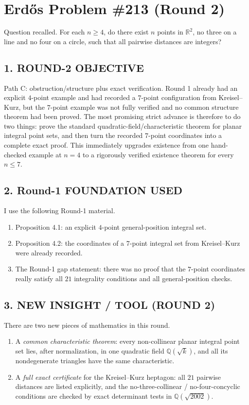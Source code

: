 \section*{Erd\H{o}s Problem \#213 (Round 2)}

Question recalled. For each $n\geq 4$, do there exist $n$ points in $\mathbb{R}^2$, no three on a line and no four on a circle, such that all pairwise distances are integers?

\subsection*{1. ROUND-2 OBJECTIVE}
Path C: obstruction/structure plus exact verification. Round 1 already had an explicit $4$-point example and had recorded a $7$-point configuration from Kreisel--Kurz, but the $7$-point example was not fully verified and no common structure theorem had been proved. The most promising strict advance is therefore to do two things: prove the standard quadratic-field/characteristic theorem for planar integral point sets, and then turn the recorded $7$-point coordinates into a complete exact proof. This immediately upgrades existence from one hand-checked example at $n=4$ to a rigorously verified existence theorem for every $n\leq 7$.

\subsection*{2. Round-1 FOUNDATION USED}
I use the following Round-1 material.
\begin{enumerate}
\item Proposition 4.1: an explicit $4$-point general-position integral set.
\item Proposition 4.2: the coordinates of a $7$-point integral set from Kreisel--Kurz were already recorded.
\item The Round-1 gap statement: there was no proof that the $7$-point coordinates really satisfy all $21$ integrality conditions and all general-position checks.
\end{enumerate}

\subsection*{3. NEW INSIGHT / TOOL (ROUND 2)}
There are two new pieces of mathematics in this round.
\begin{enumerate}
\item A \emph{common characteristic theorem}: every non-collinear planar integral point set lies, after normalization, in one quadratic field $\mathbb{Q}(\sqrt{k})$, and all its nondegenerate triangles have the same characteristic.
\item A \emph{full exact certificate} for the Kreisel--Kurz heptagon: all $21$ pairwise distances are listed explicitly, and the no-three-collinear / no-four-concyclic conditions are checked by exact determinant tests in $\mathbb{Q}(\sqrt{2002})$.
\end{enumerate}


